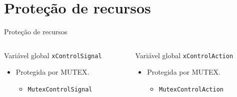 \documentclass{if-beamer}
\begin{document}
\section{Proteção de recursos}

\begin{frame}{Proteção de recursos}
	
	\begin{columns}
		
		\begin{column}{0.5\textwidth}
			
			\begin{block}{Variável global \texttt{xControlSignal}}
				
				\begin{itemize}
					\item Protegida por MUTEX.
					\begin{itemize}
						\item \texttt{MutexControlSignal}
						
					\end{itemize}
				\end{itemize}
				
			\end{block}
			
		\end{column}
		
		\begin{column}{0.5\textwidth}
			
			
			
			\begin{block}{Variável global \texttt{xControlAction}}
				
				\begin{itemize}
					\item Protegida por MUTEX.
					\begin{itemize}
						\item \texttt{MutexControlAction}
						
					\end{itemize}
					
				\end{itemize}
				
			\end{block}
			
		\end{column}
		
	\end{columns}
	
\end{frame}
\end{document}
